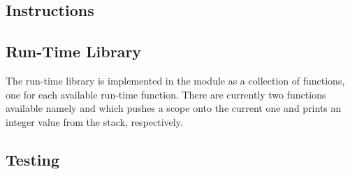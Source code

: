 \subsection{Instructions}
\label{sec:implementation:instr}


\subsection{Run-Time Library}

The run-time library is implemented in the  module as a
collection of functions, one for each available run-time function. There are
currently two functions available namely  and 
which pushes a scope onto the current one and prints an integer value from the
stack, respectively.


\subsection{Testing}


